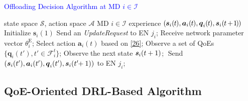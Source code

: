 \documentclass[10pt, journal,letterpaper]{IEEEtran}
\begin{document}
\begin{algorithm} [tbp]
	\caption{\textcolor{blue}{Offloading Decision Algorithm at MD $i \in \mathcal{I}$}}\label{alg:cap}
	\begin{algorithmic}[1]
		\renewcommand{\algorithmicrequire}{\textbf{Input:}} 
		\renewcommand{\algorithmicensure}{\textbf{Output:}}
		\Require state space $\mathcal{S}$, action space $\mathcal{A}$
		\Ensure MD $i \in \mathcal{I}$ experience  \textcolor{blue}{ $(\hspace{-0.2mm}\boldsymbol{s}_i(\hspace{-0.2mm}t\hspace{-0.2mm}), \boldsymbol{a}_i(\hspace{-0.2mm}t\hspace{-0.2mm}), \boldsymbol{q}_i(\hspace{-0.2mm}t\hspace{-0.2mm}), \boldsymbol{s}_i(\hspace{-0.2mm}t\hspace{-0.3mm}+\hspace{-0.3mm}\hspace{-0.2mm}1\hspace{-0.2mm}\hspace{-0.2mm})\hspace{-0.2mm})$}
		\State Initialize $\boldsymbol{s}_i(1)$
		\State Send an \textit{UpdateRequest} to EN $j_i$;
		\State Receive network parameter vector $\theta_i^{\text{E}}$;
		\State Select action $\boldsymbol{a}_i(t)$ based on \eqref{26};
		\EndIf
		\State Observe a set of QoEs $\{\boldsymbol{q}_i(t'), t' \in \mathcal{F}_i^t\}$;
		\State Observe\textcolor{white}{i}the next\textcolor{white}{i}state $\textbf{\textit{s}}_i(t+1)$;\textcolor{white}{i}
		\State Send \hspace{-1mm} $(\boldsymbol{s}_i(t'), \boldsymbol{a}_i(t'), \boldsymbol{q}_i(t'), \boldsymbol{s}_i(t'\hspace{-1mm}+1))$ to EN $j_i$;
		\EndFor
		\EndFor
		\EndFor
	\end{algorithmic}
\end{algorithm}


\subsection{QoE-Oriented DRL-Based Algorithm}
\label{section:1}
\end{document}
